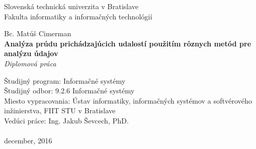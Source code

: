 \documentclass[12pt, a4paper, titlepage, slovak]{book}
\begin{document}
\begin{titlepage}
\begin{center}                                                                                                                                                   
{\Large Slovenská technická univerzita v Bratislave} \\
{\Large Fakulta informatiky a informačných technológií} \\
\vspace*{1\baselineskip}
\large {}
\vfill %


{{Bc. Matúš Cimerman}} \\
\vspace*{1\baselineskip}
{\LARGE {\textbf{Analýza prúdu prichádzajúcich udalostí použitím rôznych metód pre analýzu údajov}}} %
\\
\vspace*{1\baselineskip}
\textit{Diplomová práca}\\
\vfill %
\end{center}
{Študijný program: Informačné systémy}\\
{Študijný odbor: 9.2.6 Informačné systémy}\\
{Miesto vypracovania: Ústav informatiky, informačných systémov a softvérového inžinierstva, FIIT STU v Bratislave}\\
{Vedúci práce: Ing. Jakub Ševcech, PhD.}\\
\\
{december, 2016}

\end{titlepage}
\restoregeometry
\thispagestyle{empty}
\emptydoublepage

%








\emptydoublepage


\emptydoublepage
\end{document}
